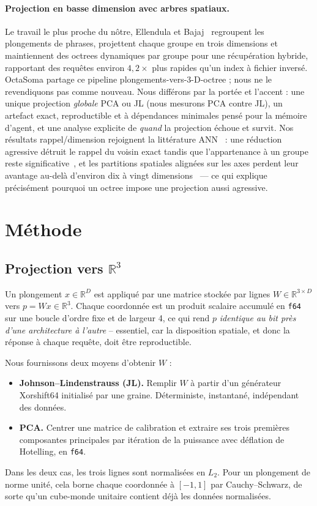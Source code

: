 \documentclass[11pt]{article}
\begin{document}
\paragraph{Projection en basse dimension avec arbres spatiaux.} Le travail le plus
proche du nôtre, Ellendula et Bajaj~\cite{octreerag} regroupent les plongements de
phrases, projettent chaque groupe en trois dimensions et maintiennent des octrees
dynamiques par groupe pour une récupération hybride, rapportant des requêtes
environ $4{,}2\times$ plus rapides qu'un index à fichier inversé. OctaSoma partage
ce pipeline plongements-vers-3-D-octree ; nous ne le revendiquons pas comme
nouveau. Nous différons par la portée et l'accent : une unique projection
\emph{globale} PCA ou JL (nous mesurons PCA contre JL), un artefact exact,
reproductible et à dépendances minimales pensé pour la mémoire d'agent, et une
analyse explicite de \emph{quand} la projection échoue et survit. Nos résultats
rappel/dimension rejoignent la littérature ANN~\cite{drsurvey} : une réduction
agressive détruit le rappel du voisin exact tandis que l'appartenance à un groupe
reste significative~\cite{nnmeaning}, et les partitions spatiales alignées sur les
axes perdent leur avantage au-delà d'environ dix à vingt
dimensions~\cite{highdimann} --- ce qui explique précisément pourquoi un octree
impose une projection aussi agressive.

\section{Méthode}
\subsection{Projection vers $\mathbb{R}^3$}
Un plongement $x\in\mathbb{R}^D$ est appliqué par une matrice stockée par lignes
$W\in\mathbb{R}^{3\times D}$ vers $p = Wx \in \mathbb{R}^3$. Chaque coordonnée est un
produit scalaire accumulé en \texttt{f64} sur une boucle d'ordre fixe et de largeur 4,
ce qui rend $p$ \emph{identique au bit près d'une architecture à l'autre} -- essentiel,
car la disposition spatiale, et donc la réponse à chaque requête, doit être
reproductible.

Nous fournissons deux moyens d'obtenir $W$ :
\begin{itemize}
  \item \textbf{Johnson--Lindenstrauss (JL).} Remplir $W$ à partir d'un générateur
  Xorshift64 initialisé par une graine. Déterministe, instantané, indépendant des
  données.
  \item \textbf{PCA.} Centrer une matrice de calibration et extraire ses trois
  premières composantes principales par itération de la puissance avec déflation de
  Hotelling, en \texttt{f64}.
\end{itemize}
Dans les deux cas, les trois lignes sont normalisées en $L_2$. Pour un plongement de
norme unité, cela borne chaque coordonnée à $[-1,1]$ par Cauchy--Schwarz, de sorte
qu'un cube-monde unitaire contient déjà les données normalisées.
\end{document}
